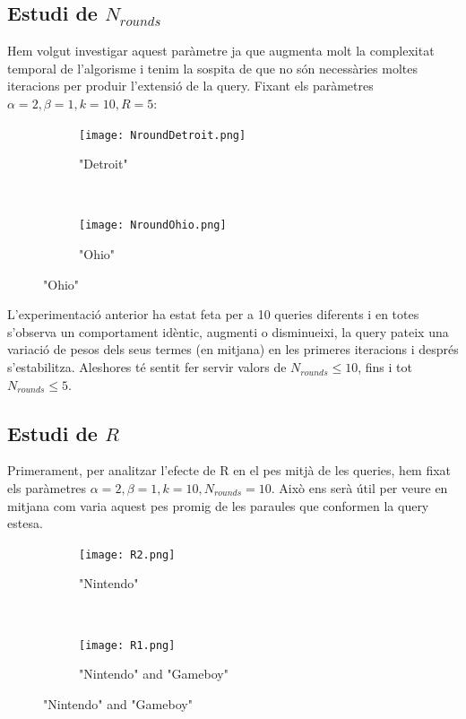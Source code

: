\documentclass[12pt]{article}
\begin{document}
\subsection{Estudi de $N_{rounds}$}
Hem volgut investigar aquest paràmetre ja que augmenta molt la complexitat temporal de l'algorisme i tenim la sospita de que no són necessàries moltes iteracions per produir l'extensió de la query. Fixant els paràmetres $\alpha = 2, \beta = 1, k = 10, R = 5$:

\begin{figure}[h!]
    \centering
    \hspace{-1cm}
    \begin{subfigure}[b]{0.5\textwidth}
        \texttt{[image: NroundDetroit.png]}
        \caption{"Detroit"}
        \label{fig:DPPM}
    \end{subfigure}
    ~ %
    \begin{subfigure}[b]{0.5\textwidth}
        \texttt{[image: NroundOhio.png]}
        \caption{"Ohio"}
        \label{fig:OPPM}
    \end{subfigure}
\end{figure}
\FloatBarrier

L'experimentació anterior ha estat feta per a 10 queries diferents i en totes s'observa un comportament idèntic, augmenti o disminueixi, la query pateix una variació de pesos dels seus termes (en mitjana) en les primeres iteracions i després s'estabilitza. Aleshores té sentit fer servir valors de $N_{rounds} \leq 10$, fins i tot $N_{rounds} \leq 5$.

\subsection{Estudi de $R$}
Primerament, per analitzar l'efecte de R en el pes mitjà de les queries, hem fixat els paràmetres $\alpha = 2, \beta = 1, k = 10, N_{rounds} = 10$. Això ens serà útil per veure en mitjana com varia aquest pes promig de les paraules que conformen la query estesa. 
\\

\begin{figure}[h!]
    \centering
    \hspace{-1cm}
    \begin{subfigure}[b]{0.5\textwidth}
        \texttt{[image: R2.png]}
        \caption{"Nintendo"}
        \label{fig:R1PPM}
    \end{subfigure}
    ~ %
    \begin{subfigure}[b]{0.5\textwidth}
        \texttt{[image: R1.png]}
        \caption{"Nintendo" and "Gameboy"}
        \label{fig:R2PPM}
    \end{subfigure}
\end{figure}
\FloatBarrier
\end{document}
